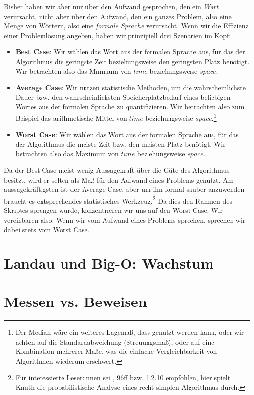 Bisher haben wir aber nur über den Aufwand gesprochen,
den ein \emph{Wort} verursacht,
nicht aber über den Aufwand,
den ein ganzes Problem, also eine Menge von Wörtern,
also eine \emph{formale Sprache} verursacht.
Wenn wir die Effizienz einer Problemlösung angeben,
haben wir prinzipiell drei Szenarien im Kopf:
\begin{itemize}
    \item \textbf{Best Case}: Wir wählen das Wort aus der formalen Sprache aus,
        für das der Algorithmus die geringste Zeit
        beziehungsweise den geringsten Platz benötigt.
        Wir betrachten also das Minimum von $time$ beziehungsweise $space$.
    \item \textbf{Average Case}: Wir nutzen statistische Methoden, um die wahrscheinlichste
        Dauer bzw. den wahrscheinlichsten Speicherplatzbedarf eines beliebigen Wortes aus
        der formalen Sprache zu quantifizieren.
        Wir betrachten also zum Beispiel das arithmetische Mittel von $time$ beziehungsweise
        $space$.\footnote{Der Median wäre ein weiteres Lagemaß, dass genutzt werden kann,
        oder wir achten auf die Standardabweichung (Streuungsmaß), oder auf eine Kombination 
        mehrerer Maße, was die einfache Vergleichbarkeit von Algorithmen wiederum erschwert.}
    \item \textbf{Worst Case}: Wir wählen das Wort aus der formalen Sprache aus,
        für das der Algorithmus die meiste Zeit bzw. den meisten Platz benötigt.
        Wir betrachten also das Maximum von $time$ beziehungsweise $space$.
\end{itemize} 

Da der Best Case meist wenig Aussagekraft über die Güte des Algorithmus besitzt,
wird er selten als Maß für den Aufwand eines Problems genutzt.
Am aussagekräftigsten ist der Average Case,
aber um ihn formal sauber anzuwenden braucht es
entsprechendes statistisches Werkzeug.\footnote{
    Für interessierte Leser:innen sei \cite{knuth1}, 96ff bzw. 1.2.10 empfohlen,
    hier spielt Knuth die probabilistische Analyse eines recht simplen Algorithmus durch.} 
Da dies den Rahmen des Skriptes sprengen würde,
konzentrieren wir uns auf den Worst Case.
Wir vereinbaren also: Wenn wir vom Aufwand eines Problems sprechen,
sprechen wir dabei stets vom Worst Case.







\section{Landau und Big-O: Wachstum}
\section{Messen vs. Beweisen}\label{messenVsBeweisen}

